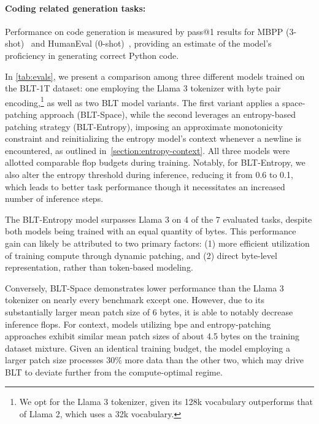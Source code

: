 \paragraph{Coding related generation tasks:} Performance on code generation is measured by pass@1 results for MBPP (3-shot)~\citep{Eval_MBPP} and HumanEval (0-shot)~\citep{Eval_HumanEval}, providing an estimate of the model’s proficiency in generating correct Python code.

In \autoref{tab:evals}, we present a comparison among three different models trained on the {\textsc BLT}-1T dataset: one employing the Llama 3 tokenizer with byte pair encoding,\footnote{We opt for the Llama 3 tokenizer, given its 128k vocabulary outperforms that of Llama 2, which uses a 32k vocabulary.} as well as two {\textsc BLT} model variants. The first variant applies a space-patching approach ({\textsc BLT}-Space), while the second leverages an entropy-based patching strategy ({\textsc BLT}-Entropy), imposing an approximate monotonicity constraint and reinitializing the entropy model’s context whenever a newline is encountered, as outlined in~\autoref{section:entropy-context}. All three models were allotted comparable flop budgets during training. Notably, for {\textsc BLT}-Entropy, we also alter the entropy threshold during inference, reducing it from 0.6 to 0.1, which leads to better task performance though it necessitates an increased number of inference steps.

The {\textsc BLT}-Entropy model surpasses Llama 3 on 4 of the 7 evaluated tasks, despite both models being trained with an equal quantity of bytes. This performance gain can likely be attributed to two primary factors: (1) more efficient utilization of training compute through dynamic patching, and (2) direct byte-level representation, rather than token-based modeling.

Conversely, {\textsc BLT}-Space demonstrates lower performance than the Llama 3 tokenizer on nearly every benchmark except one. However, due to its substantially larger mean patch size of 6 bytes, it is able to notably decrease inference flops. For context, models utilizing bpe and entropy-patching approaches exhibit similar mean patch sizes of about 4.5 bytes on the training dataset mixture. Given an identical training budget, the model employing a larger patch size processes 30\% more data than the other two, which may drive {\textsc BLT} to deviate further from the compute-optimal regime.

